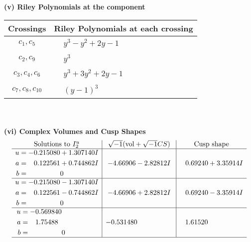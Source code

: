 \documentclass[1p]{elsarticle_modified}
\theoremstyle{definition}
\newcommand{\I}{\sqrt{-1}}
\begin{document}
\flushleft \textbf{(v) Riley Polynomials at the component}\newline \\
\begin{tabular}{m{50pt}|m{274pt}}
Crossings & \hspace{64pt}Riley Polynomials at each crossing \\
\hline $$\begin{aligned}c_{1},c_{5}\end{aligned}$$&$\begin{aligned}
&y^3- y^2+2 y-1
\end{aligned}$\\
\hline $$\begin{aligned}c_{2},c_{9}\end{aligned}$$&$\begin{aligned}
&y^3
\end{aligned}$\\
\hline $$\begin{aligned}c_{3},c_{4},c_{6}\end{aligned}$$&$\begin{aligned}
&y^3+3 y^2+2 y-1
\end{aligned}$\\
\hline $$\begin{aligned}c_{7},c_{8},c_{10}\end{aligned}$$&$\begin{aligned}
&(y-1)^3
\end{aligned}$\\
\hline
\end{tabular}\\~\\
\newpage\flushleft \textbf{(vi) Complex Volumes and Cusp Shapes}
$$\begin{array}{c|c|c}  
\text{Solutions to }I^u_{2}& \I (\text{vol} + \sqrt{-1}CS) & \text{Cusp shape}\\
 \hline 
\begin{aligned}
u &= -0.215080 + 1.307140 I \\
a &= \phantom{-}0.122561 + 0.744862 I \\
b &= \phantom{-0.000000 } 0\end{aligned}
 & -4.66906 - 2.82812 I & \phantom{-}0.69240 + 3.35914 I \\ \hline\begin{aligned}
u &= -0.215080 - 1.307140 I \\
a &= \phantom{-}0.122561 - 0.744862 I \\
b &= \phantom{-0.000000 } 0\end{aligned}
 & -4.66906 + 2.82812 I & \phantom{-}0.69240 - 3.35914 I \\ \hline\begin{aligned}
u &= -0.569840\phantom{ +0.000000I} \\
a &= \phantom{-}1.75488\phantom{ +0.000000I} \\
b &= \phantom{-0.000000 } 0\end{aligned}
 & -0.531480\phantom{ +0.000000I} & \phantom{-}1.61520\phantom{ +0.000000I}\\
 \hline 
 \end{array}$$\newpage
\end{document}
